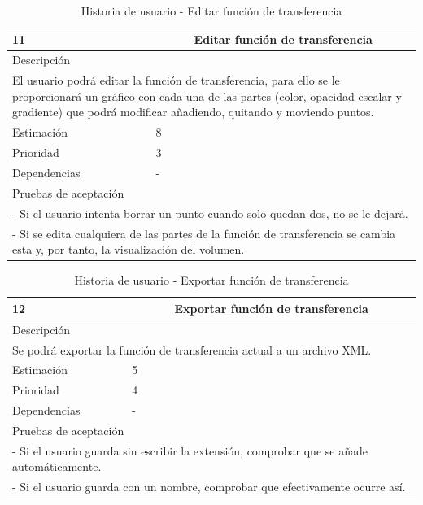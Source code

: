\begin{table}[H]
	\begin{center}
		\begin{tabular} {|l|c|l|}
			\hline
			11 & \multicolumn{2}{c|}{Editar función de transferencia} \\ \hline \hline
			\multicolumn{3}{|l|}{Descripción} \\ \hline
			\multicolumn{3}{|p{12cm}|}{El usuario podrá editar la función de transferencia, para ello se le proporcionará un gráfico con cada una de las partes (color, opacidad escalar y gradiente) que podrá modificar añadiendo, quitando y moviendo puntos.} \\ \hline
			\multicolumn{2}{|l|}{Estimación} & 8 \\ \hline
			\multicolumn{2}{|l|}{Prioridad} & 3 \\ \hline
			\multicolumn{2}{|l|}{Dependencias} & - \\ \hline
			\multicolumn{3}{|l|}{Pruebas de aceptación} \\ \hline
			\multicolumn{3}{|p{12cm}|}{ - Si el usuario intenta borrar un punto cuando solo quedan dos, no se le dejará.} \\
			\multicolumn{3}{|p{12cm}|}{ - Si se edita cualquiera de las partes de la función de transferencia se cambia esta y, por tanto, la visualización del volumen.} \\ \hline
		\end{tabular}
	\end{center}
	\caption{Historia de usuario - Editar función de transferencia}
	\label{tab:hu_editar_funcion_de_transferencia}
\end{table}

\begin{table}[H]
	\begin{center}
		\begin{tabular} {|l|c|l|}
			\hline
			12 & \multicolumn{2}{c|}{Exportar función de transferencia} \\ \hline \hline
			\multicolumn{3}{|l|}{Descripción} \\ \hline
			\multicolumn{3}{|p{12cm}|}{Se podrá exportar la función de transferencia actual a un archivo XML.} \\ \hline
			\multicolumn{2}{|l|}{Estimación} & 5 \\ \hline
			\multicolumn{2}{|l|}{Prioridad} & 4 \\ \hline
			\multicolumn{2}{|l|}{Dependencias} & - \\ \hline
			\multicolumn{3}{|l|}{Pruebas de aceptación} \\ \hline
			\multicolumn{3}{|p{12cm}|}{ - Si el usuario guarda sin escribir la extensión, comprobar que se añade automáticamente.} \\
			\multicolumn{3}{|p{12cm}|}{ - Si el usuario guarda con un nombre, comprobar que efectivamente ocurre así.} \\ \hline
		\end{tabular}
	\end{center}
	\caption{Historia de usuario - Exportar función de transferencia}
	\label{tab:hu_exportar_funcion_de_transferencia}
\end{table}

